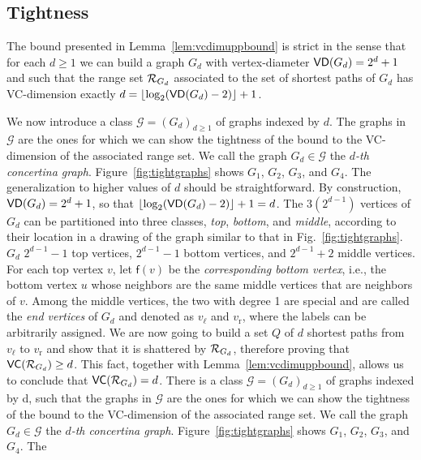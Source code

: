 \subsection{Tightness}\label{sec:tightness}
The bound presented in Lemma~\ref{lem:vcdimuppbound} is strict in the sense that
for each $d\ge 1$ we can build a graph $G_d$ with vertex-diameter
$\mathsf{VD}(G_d)=2^d+1$ and such that the range set $\mathcal{R}_{G_d}$ associated to the set of
shortest paths of $G_d$ has VC-dimension exactly
$d=\lfloor\log_2(\mathsf{VD}(G_d)-2)\rfloor+1$. 

\ifproof
We now introduce a class $\mathcal{G}=(G_d)_{d\ge 1}$ of graphs indexed by $d$.
The graphs in $\mathcal{G}$ are the ones for which we can show the tightness of
the bound to the VC-dimension of the associated range set.
We call the graph $G_d\in\mathcal{G}$ the \emph{$d$-th concertina graph}.
Figure~\ref{fig:tightgraphs} shows $G_1$, $G_2$, $G_3$, and $G_4$. The
generalization to higher values of $d$ should be straightforward.
By construction, $\mathsf{VD}(G_d)=2^d+1$, so that
$\lfloor\log_2(\mathsf{VD}(G_d)-2)\rfloor+1=d$. The $3(2^{d-1})$ vertices of $G_d$ can
be partitioned into three classes, \emph{top}, \emph{bottom}, and \emph{middle},
according to their location in a drawing of the graph similar to that in
Fig.~\ref{fig:tightgraphs}. $G_d$ $2^{d-1}-1$ top vertices, $2^{d-1}-1$ bottom vertices, and
$2^{d-1}+2$ middle vertices. For each top vertex $v$, let $\mathsf{f}(v)$ be the
\emph{corresponding bottom vertex}, i.e., the bottom vertex $u$ whose neighbors
are the same middle vertices that are neighbors of $v$. Among the middle
vertices, the two with degree 1 are special and are called the \emph{end
vertices} of $G_d$ and denoted as $v_\ell$ and $v_\mathrm{r}$, where the
labels can be arbitrarily assigned. We are now going to build a set $Q$ of $d$
shortest paths from $v_\ell$ to $v_\mathrm{r}$ and show that it is
shattered by $\mathcal{R}_{G_d}$, therefore proving that $\mathsf{VC}(\mathcal{R}_{G_d})\ge d$.
This fact, together with Lemma~\ref{lem:vcdimuppbound}, allows us to conclude
that $\mathsf{VC}(\mathcal{R}_{G_d})=d$. 
\else
There is a class $\mathcal{G}=(G_d)_{d\ge 1}$ of graphs indexed by d, such that
the graphs in $\mathcal{G}$ are the ones for which we can show the tightness of
the bound to the VC-dimension of the associated range set. We call the graph
$G_d\in\mathcal{G}$ the \emph{$d$-th concertina graph}.
Figure~\ref{fig:tightgraphs} shows $G_1$, $G_2$, $G_3$, and $G_4$. The
